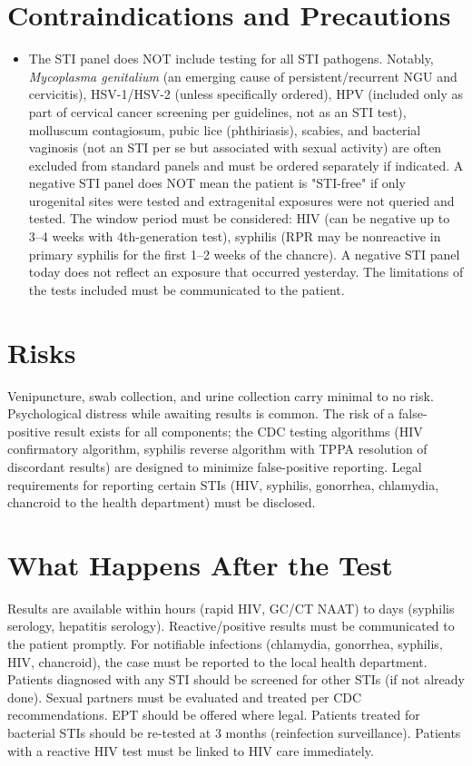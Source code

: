 \section*{Contraindications and Precautions}
\begin{itemize}
  \item The STI panel does NOT include testing for all STI pathogens. Notably, \textit{Mycoplasma genitalium} (an emerging cause of persistent/recurrent NGU and cervicitis), HSV-1/HSV-2 (unless specifically ordered), HPV (included only as part of cervical cancer screening per guidelines, not as an STI test), molluscum contagiosum, pubic lice (phthiriasis), scabies, and bacterial vaginosis (not an STI per se but associated with sexual activity) are often excluded from standard panels and must be ordered separately if indicated. A negative STI panel does NOT mean the patient is "STI-free" if only urogenital sites were tested and extragenital exposures were not queried and tested. The window period must be considered: HIV (can be negative up to 3--4 weeks with 4th-generation test), syphilis (RPR may be nonreactive in primary syphilis for the first 1--2 weeks of the chancre). A negative STI panel today does not reflect an exposure that occurred yesterday. The limitations of the tests included must be communicated to the patient.
\end{itemize}
\section*{Risks}
Venipuncture, swab collection, and urine collection carry minimal to no risk. Psychological distress while awaiting results is common. The risk of a false-positive result exists for all components; the CDC testing algorithms (HIV confirmatory algorithm, syphilis reverse algorithm with TPPA resolution of discordant results) are designed to minimize false-positive reporting. Legal requirements for reporting certain STIs (HIV, syphilis, gonorrhea, chlamydia, chancroid to the health department) must be disclosed.

\section*{What Happens After the Test}
Results are available within hours (rapid HIV, GC/CT NAAT) to days (syphilis serology, hepatitis serology). Reactive/positive results must be communicated to the patient promptly. For notifiable infections (chlamydia, gonorrhea, syphilis, HIV, chancroid), the case must be reported to the local health department. Patients diagnosed with any STI should be screened for other STIs (if not already done). Sexual partners must be evaluated and treated per CDC recommendations. EPT should be offered where legal. Patients treated for bacterial STIs should be re-tested at 3 months (reinfection surveillance). Patients with a reactive HIV test must be linked to HIV care immediately.

